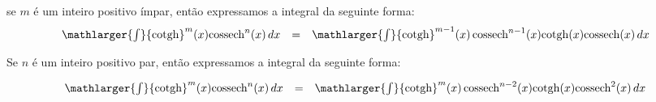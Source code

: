 \cleardoublepage\documentclass[../main.tex]{subfiles}
\begin{document}
\subsection[\formula{Integrais do tipo   $\int {\rm cotgh} ^m (x)\, {\rm cossech}^n(x)\,dx$}]{}
\begin{compactenum}[i.]
\item  se \(m\) é um inteiro positivo ímpar, então expressamos a integral da seguinte forma: 
\[ \begin{array}{lcl} \mathlarger{\int} {\rm cotgh} ^m (x) {\rm cossech}^n(x)\,dx &=& \mathlarger{\int} {\rm cotgh} ^{m-1}( x)\, {\rm cossech}^{n-1}(x) {\rm cotgh} (x) {\rm cossech} (x)\,dx\\ \end{array} \]
\item Se \(n\) é um inteiro positivo par, então expressamos a integral da seguinte forma:

\[ \begin{array}{lcl}  \mathlarger{\int} {\rm cotgh}^m (x) {\rm cossech}^n(x)\,dx &=& \mathlarger{\int} {\rm cotgh}^m (x)\, {\rm cossech}^{n-2}(x) {\rm cotgh}(x) {\rm cossech}^2(x)\,dx\end{array} \]
\end{compactenum}
\end{document}
